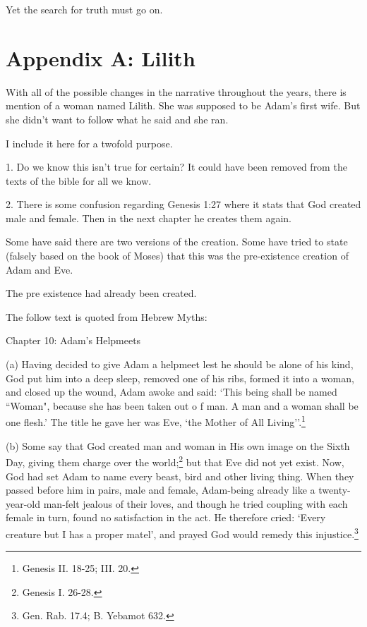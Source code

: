 \documentclass{article}
\begin{document}
Yet the search for truth must go on.

\newpage

\section{Appendix A: Lilith}

With all of the possible changes in the narrative throughout the years, there is
mention of a woman named Lilith. She was supposed to be Adam's first wife. But
she didn't want to follow what he said and she ran.

I include it here for a twofold purpose.

1. Do we know this isn't true for certain? It could have been removed from the
texts of the bible for all we know.

2. There is some confusion regarding Genesis 1:27 where it stats that God
created male and female. Then in the next chapter he creates them again.

Some have said there are two versions of the creation. Some have tried to state
(falsely based on the book of Moses) that this was the pre-existence creation of
Adam and Eve.

The pre existence had already been created.

The follow text is quoted from Hebrew Myths\cite{myth}:

Chapter 10: Adam's Helpmeets

(a) Having decided to give Adam a helpmeet lest he should be alone
of his kind, God put him into a deep sleep, removed one of his
ribs, formed it into a woman, and closed up the wound, Adam awoke
and said: `This being shall be named ``Woman", because she has been
taken out o f man. A man and a woman shall be one flesh.' The
title he gave her was Eve, `the Mother of 
All Living''.\footnote{Genesis II. 18-25; III. 20.}

(b) Some say that God created man and woman in His own image on
the Sixth Day, giving them charge over the 
world;\footnote{Genesis I. 26-28.} but that Eve
did not yet exist. Now, God had set Adam to name every beast, bird
and other living thing. When they passed before him in pairs, male
and female, Adam-being already like a twenty-year-old man-felt
jealous of their loves, and though he tried coupling with each
female in turn, found no satisfaction in the act. He therefore
cried: `Every creature but I has a proper matel', and prayed God
would remedy this injustice.\footnote{Gen. Rab. 17.4; B. Yebamot 632.}
\end{document}
